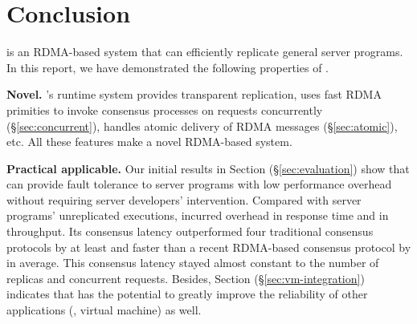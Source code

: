\section{Conclusion} \label{sec:conclusion}

\xxx is an RDMA-based \paxos system that can efficiently replicate general 
server programs. In this report, we have demonstrated the following properties 
of \xxx.

\textbf{Novel.} \xxx's runtime system provides transparent replication, uses 
fast RDMA primities to invoke consensus processes on requests concurrently 
(\S\ref{sec:concurrent}), handles atomic delivery of RDMA messages 
(\S\ref{sec:atomic}), etc. All these features make \xxx a novel RDMA-based 
\paxos system.

\textbf{Practical applicable.} Our initial results in Section 
(\S\ref{sec:evaluation}) show that \xxx can provide fault tolerance to server 
programs with low performance overhead without requiring server developers' 
intervention. Compared with \nprog server programs' unreplicated executions, 
\xxx incurred \latencyoverhead overhead in response time and \tputoverhead in 
throughput. Its consensus latency outperformed four traditional consensus 
protocols by at least \comptradlow and faster than a recent RDMA-based consensus 
protocol \dare by \fasterDARE in average. This consensus latency stayed almost 
constant  to the number of replicas and concurrent requests. Besides, Section 
(\S\ref{sec:vm-integration}) indicates that \xxx has the potential to greatly 
improve the reliability of other applications (\eg, virtual machine) as well.
